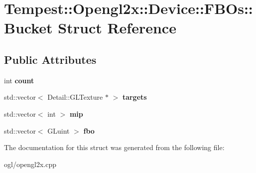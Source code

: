 \hypertarget{struct_tempest_1_1_opengl2x_1_1_device_1_1_f_b_os_1_1_bucket}{\section{Tempest\+:\+:Opengl2x\+:\+:Device\+:\+:F\+B\+Os\+:\+:Bucket Struct Reference}
\label{struct_tempest_1_1_opengl2x_1_1_device_1_1_f_b_os_1_1_bucket}
}
\subsection*{Public Attributes}
\begin{DoxyCompactItemize}
\item 
\hypertarget{struct_tempest_1_1_opengl2x_1_1_device_1_1_f_b_os_1_1_bucket_ab4b49500a6b0871d3953aad5b2237b1c}{int {\bfseries count}}\label{struct_tempest_1_1_opengl2x_1_1_device_1_1_f_b_os_1_1_bucket_ab4b49500a6b0871d3953aad5b2237b1c}

\item 
\hypertarget{struct_tempest_1_1_opengl2x_1_1_device_1_1_f_b_os_1_1_bucket_abc637c03553e5f328b2b516aa0fbc54c}{std\+::vector$<$ Detail\+::\+G\+L\+Texture $\ast$ $>$ {\bfseries targets}}\label{struct_tempest_1_1_opengl2x_1_1_device_1_1_f_b_os_1_1_bucket_abc637c03553e5f328b2b516aa0fbc54c}

\item 
\hypertarget{struct_tempest_1_1_opengl2x_1_1_device_1_1_f_b_os_1_1_bucket_aae30555561fa1ae6f02e60cc6aa34782}{std\+::vector$<$ int $>$ {\bfseries mip}}\label{struct_tempest_1_1_opengl2x_1_1_device_1_1_f_b_os_1_1_bucket_aae30555561fa1ae6f02e60cc6aa34782}

\item 
\hypertarget{struct_tempest_1_1_opengl2x_1_1_device_1_1_f_b_os_1_1_bucket_ac29afc975eee43c879b53c032067b769}{std\+::vector$<$ G\+Luint $>$ {\bfseries fbo}}\label{struct_tempest_1_1_opengl2x_1_1_device_1_1_f_b_os_1_1_bucket_ac29afc975eee43c879b53c032067b769}

\end{DoxyCompactItemize}


The documentation for this struct was generated from the following file\+:\begin{DoxyCompactItemize}
\item 
ogl/opengl2x.\+cpp\end{DoxyCompactItemize}

